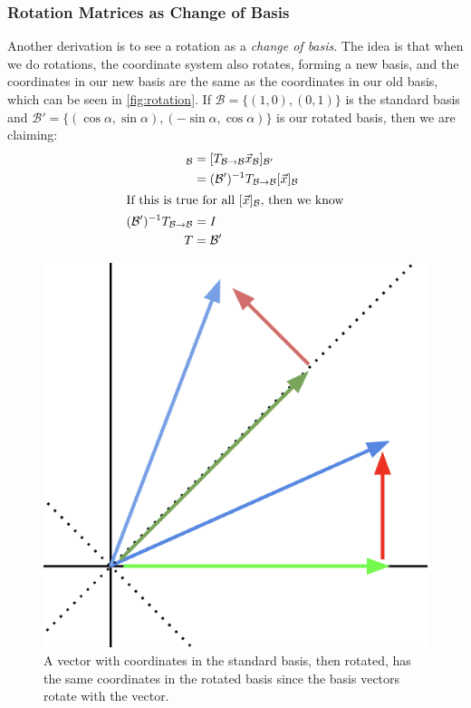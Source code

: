 \documentclass[11pt, oneside]{article}
\begin{document}
\subsubsection{Rotation Matrices as Change of Basis}
Another derivation is to see a rotation as a \textit{change of basis}. The idea
is that when we do rotations, the coordinate system also rotates, forming a new
basis, and the coordinates in our new basis are the same as the coordinates in
our old basis, which can be seen in \autoref{fig:rotation}. If \( \mathcal{B}
= \{(1, 0), (0, 1)\} \) is the standard basis and \( \mathcal{B}' = \{(\cos
\alpha, \sin \alpha), (-\sin \alpha, \cos \alpha)\} \) is our rotated basis,
then we are claiming:
\begin{align*}
  [\vec{x}]_{\mathcal{B}} &= [T_{\mathcal{B} \to \mathcal{B}} \vec{x}_{\mathcal{B}}]_{\mathcal{B'}} \\
                          &= (\mathcal{B}')^{-1} T_{\mathcal{B} \to \mathcal{B}} [\vec{x}]_{\mathcal{B}} \\
  \shortintertext{If this is true for all \( [\vec{x}]_{\mathcal{B}} \), then we know}
  (\mathcal{B}')^{-1} T_{\mathcal{B} \to \mathcal{B}} &= I \\
  T &= \mathcal{B'}
\end{align*}

\begin{figure}[h!]
  \centering
  \includegraphics[scale=1]{rotation.png}
  \caption{A vector with coordinates in the standard basis,
    then rotated, has the same coordinates in the rotated
    basis since the basis vectors rotate with the vector.}
  \label{fig:rotation}
\end{figure}
\end{document}
